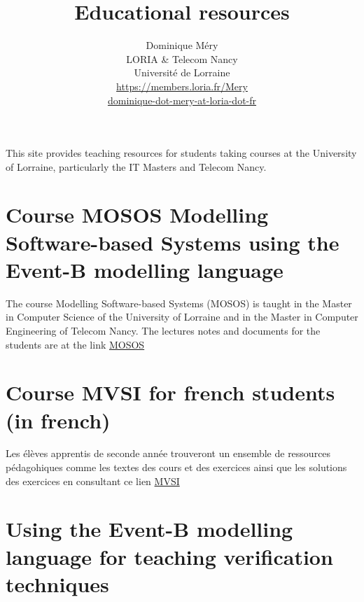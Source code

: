 \documentclass[ 12pt]{article}
\title{Educational resources}
\author{Dominique M\'ery\\
LORIA \& Telecom Nancy\\ Universit\'e de Lorraine\\
\url{https://members.loria.fr/Mery}\\ \url{dominique-dot-mery-at-loria-dot-fr}}
\begin{document}
  \setcounter{ex}{1}
\maketitle

This site provides teaching resources for students taking courses at
the University of Lorraine, particularly the IT Masters and Telecom
Nancy.




\section{ Course MOSOS Modelling Software-based Systems using  the
  Event-B modelling language}
\label{sec:course-mosos-modell}


The   course Modelling Software-based Systems (MOSOS) is taught in
the Master  in Computer Science of the University of Lorraine  and in
the Master in Computer Engineering of Telecom Nancy. The  lectures notes  and documents for the students  are  at the link
\href{https://mery54.github.io/teaching/mosos}{MOSOS}



\section{Course MVSI for french students (in french) }



Les élèves    apprentis de seconde année
trouveront un ensemble de ressources pédagohiques comme les 
textes des cours et des exercices ainsi que les solutions des
exercices en consultant ce lien
\href{https://mery54.github.io/teaching/mvsi}{MVSI}


\section{Using  the Event-B modelling language  for teaching verification 
techniques }
\end{document}
